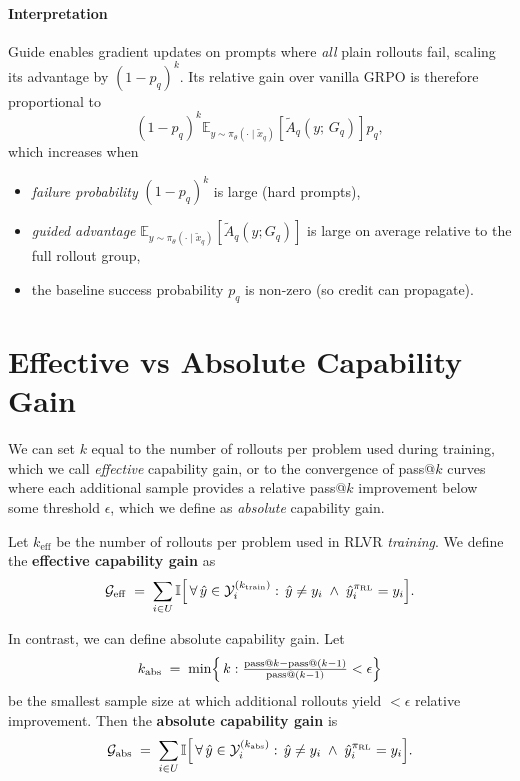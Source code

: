 \documentclass{article}
\begin{document}
{\paragraph{Interpretation} Guide enables gradient updates on prompts where \emph{all} plain rollouts
fail, scaling its advantage by $(1-p_q)^k$.  
Its relative gain over vanilla GRPO is therefore proportional to
\begin{equation}
\label{eq:interpret_gain}
(1 - p_q)^k  \mathbb{E}_{y \sim \pi_\theta(\cdot \mid \tilde{x}_q)}\left[\tilde A_q(y;\, G_q)\right]  p_q,
\end{equation}
which increases when
\begin{itemize}
  \item \emph{failure probability} $(1-p_q)^k$ is large (hard prompts),
\item \emph{guided advantage} $\mathbb{E}_{y \sim \pi_\theta(\cdot \mid \tilde{x}_q)}[\tilde A_q(y; G_q)]$ is large on average relative to the full rollout group,
  \item the baseline success probability $p_q$ is non-zero (so credit
        can propagate).
\end{itemize}

\section{Effective vs Absolute Capability Gain}
\label{app:abs_cap_gain}
We can set $k$ equal to the number of rollouts per problem used during training, which we call \textit{effective} capability gain, or to the convergence of pass@$k$ curves where each additional sample provides a relative pass@$k$ improvement below some threshold $\epsilon$, which we define as \textit{absolute} %
 capability gain.

\noindent Let \(k_{\mathrm{eff}}\) be the number of rollouts per problem used in RLVR \textit{training}.  We define the {\bf effective capability gain} as
\begin{equation}
\mathcal{G}_{\mathrm{eff}}
\;=\;
\sum_{i\in U}
\mathbb{I}\Bigl[\,
\forall\,\hat y\in\mathcal Y_i^{(k_{\mathrm{train}})}:\,\hat y\neq y_i
\;\wedge\;\hat y_i^{\pi_{\mathrm{RL}}}=y_i
\Bigr].
\end{equation}

\noindent In contrast, we can define absolute capability gain. Let
\[
k_{\mathrm{abs}}
\;=\;
\min\Bigl\{\,k : \tfrac{\mathrm{pass}@k - \mathrm{pass}@{(k-1)}}{\mathrm{pass}@{(k-1)}} < \epsilon\Bigr\}
\]
be the smallest sample size at which additional rollouts yield $< \epsilon$ relative improvement.  Then the {\bf absolute capability gain} is
\begin{equation}
\mathcal{G}_{\mathrm{abs}}
\;=\;
\sum_{i\in U}
\mathbb{I}\Bigl[\,
\forall\,\hat y\in\mathcal Y_i^{(k_{\mathrm{abs}})}:\,\hat y\neq y_i
\;\wedge\;\hat y_i^{\pi_{\mathrm{RL}}}=y_i
\Bigr].
\end{equation}

}
\end{document}
